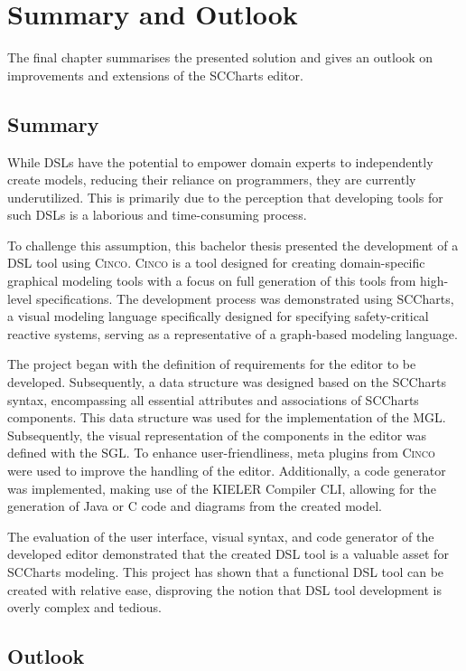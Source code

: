 \chapter{Summary and Outlook} \label{Conclusion}
The final chapter summarises the presented solution and gives an outlook on improvements and extensions of the SCCharts editor.

\section{Summary}
While DSLs have the potential to empower domain experts to independently create models, reducing their reliance on programmers, they are currently underutilized. This is primarily due to the perception that developing tools for such DSLs is a laborious and time-consuming process.

To challenge this assumption, this bachelor thesis presented the development of a DSL tool using \textsc{Cinco}. \textsc{Cinco} is a tool designed for creating domain-specific graphical modeling tools with a focus on full generation of this tools from high-level specifications. The development process was demonstrated using SCCharts, a visual modeling language specifically designed for specifying safety-critical reactive systems, serving as a representative of a graph-based modeling language.

The project began with the definition of requirements for the editor to be developed. Subsequently, a data structure was designed based on the SCCharts syntax, encompassing all essential attributes and associations of SCCharts components. This data structure was used for the implementation of the MGL. Subsequently, the visual representation of the components in the editor was defined with the SGL. To enhance user-friendliness, meta plugins from \textsc{Cinco} were used to improve the handling of the editor. Additionally, a code generator was implemented, making use of the KIELER Compiler CLI, allowing for the generation of Java or C code and diagrams from the created model.

The evaluation of the user interface, visual syntax, and code generator of the developed editor demonstrated that the created DSL tool is a valuable asset for SCCharts modeling. This project has shown that a functional DSL tool can be created with relative ease, disproving the notion that DSL tool development is overly complex and tedious.
\section{Outlook}
